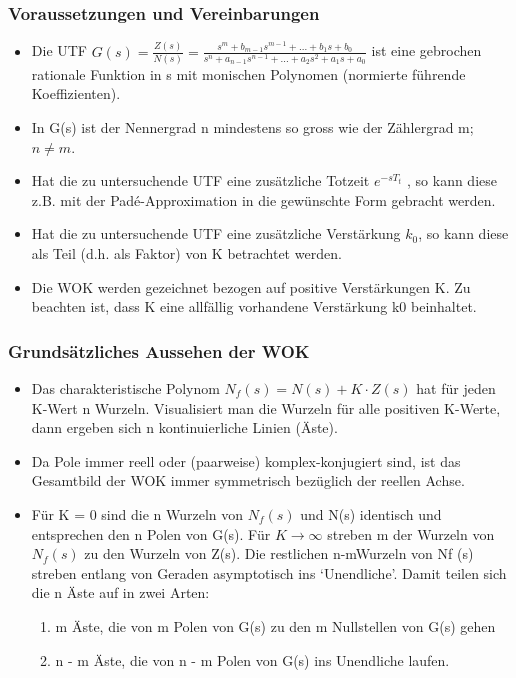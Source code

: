 \subsubsection{Voraussetzungen und Vereinbarungen}
\begin{itemize}
\item  Die UTF $G(s)=\frac{Z(s)}{N(s)}=\frac{s^m + b_{m-1}s^{m-1}+ ... + b_{1}s+b_{0}}{s^{n}+a_{n-1}s^{n-1} + ... + a_{2}s^{2}+a_{1}s + a_{0}}$
ist eine gebrochen rationale
Funktion in s mit monischen Polynomen (normierte führende Koeffizienten).
\item  In G(s) ist der Nennergrad n mindestens so gross wie der Zählergrad m; $n \neq m$.
\item  Hat die zu untersuchende UTF eine zusätzliche Totzeit $e^{-sT_t}$ , so kann diese
z.B. mit der Padé-Approximation in die gewünschte Form gebracht werden.
\item  Hat die zu untersuchende UTF eine zusätzliche Verstärkung $k_0$, so kann diese
als Teil (d.h. als Faktor) von K betrachtet werden.
\item  Die WOK werden gezeichnet bezogen auf positive Verstärkungen K. Zu beachten
ist, dass K eine allfällig vorhandene Verstärkung k0 beinhaltet.
\end{itemize}

\subsubsection{Grundsätzliches Aussehen der WOK}
\begin{itemize}
\item  Das charakteristische Polynom $N_f (s) = N(s)+K \cdot Z(s)$ hat für jeden K-Wert
n Wurzeln. Visualisiert man die Wurzeln für alle positiven K-Werte, dann
ergeben sich n kontinuierliche Linien (Äste).
\item  Da Pole immer reell oder (paarweise) komplex-konjugiert sind, ist das Gesamtbild
der WOK immer symmetrisch bezüglich der reellen Achse.
\item  Für K = 0 sind die n Wurzeln von $N_f(s)$ und N(s) identisch und entsprechen
den n Polen von G(s).
Für $K \rightarrow \infty$ streben m der Wurzeln von $N_f(s)$ zu den Wurzeln von Z(s). Die
restlichen n-mWurzeln von Nf (s) streben entlang von Geraden asymptotisch
ins ‘Unendliche’.
Damit teilen sich die n Äste auf in zwei Arten:
\begin{enumerate}
\item m Äste, die von m Polen von G(s) zu den m Nullstellen von G(s) gehen
\item n - m Äste, die von n - m Polen von G(s) ins Unendliche laufen.
\end{enumerate}
\end{itemize}


